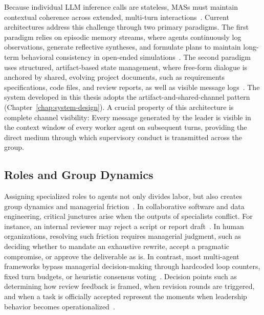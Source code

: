 Because individual \ac{LLM} inference calls are stateless, \acp{MAS} must maintain contextual coherence across extended, multi-turn interactions~\cite{white2023promptpatterncatalogenhance, qian2024chatdevcommunicativeagentssoftware, wang2025talkstructurallyacthierarchically}.
Current architectures address this challenge through two primary paradigms.
The first paradigm relies on episodic memory streams, where agents continuously log observations, generate reflective syntheses, and formulate plans to maintain long-term behavioral consistency in open-ended simulations~\cite{park2023generativeagentsinteractivesimulacra}.
The second paradigm uses structured, artifact-based state management, where free-form dialogue is anchored by shared, evolving project documents, such as requirements specifications, code files, and review reports, as well as visible message logs~\cite{hong2024metagptmetaprogrammingmultiagent, qian2024chatdevcommunicativeagentssoftware}.
The system developed in this thesis adopts the artifact-and-shared-channel pattern (Chapter~\ref{chap:system-design}).
A crucial property of this architecture is complete channel visibility: 
Every message generated by the leader is visible in the context window of every worker agent on subsequent turns, providing the direct medium through which supervisory conduct is transmitted across the group.

\subsection{Roles and Group Dynamics}
\label{subsec:roles-group-dynamics}

Assigning specialized roles to agents not only divides labor, but also creates group dynamics and managerial friction~\cite{chen2023agentversefacilitatingmultiagentcollaboration, wang2026multiagentsystemsclassicalparadigms}.
In collaborative software and data engineering, critical junctures arise when the outputs of specialists conflict.
For instance, an internal reviewer may reject a script or report draft~\cite{qian2024chatdevcommunicativeagentssoftware, hong2024metagptmetaprogrammingmultiagent}.
In human organizations, resolving such friction requires managerial judgment, such as deciding whether to mandate an exhaustive rewrite, accept a pragmatic compromise, or approve the deliverable as is.
In contrast, most multi-agent frameworks bypass managerial decision-making through hardcoded loop counters, fixed turn budgets, or heuristic consensus voting~\cite{qian2024chatdevcommunicativeagentssoftware, hong2024metagptmetaprogrammingmultiagent}.
Decision points such as determining how review feedback is framed, when revision rounds are triggered, and when a task is officially accepted represent the moments when leadership behavior becomes operationalized~\cite{guo2024embodiedllmagentslearn, muralidharan2025lessonshumanteamsapplied, kwak2026leadershipcoordinationcontrolbehavioral}.

